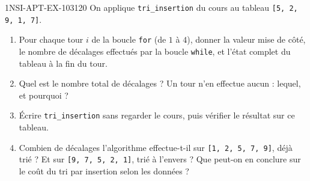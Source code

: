 \begin{exercice}{1NSI-APT-EX-103}{1}{20}
On applique \lstinline{tri_insertion} du cours au tableau \lstinline{[5, 2, 9, 1, 7]}.
\begin{enumerate}
  \item Pour chaque tour $i$ de la boucle \lstinline{for} (de $1$ à $4$), donner la valeur
    mise de côté, le nombre de décalages effectués par la boucle \lstinline{while}, et
    l'état complet du tableau à la fin du tour.
  \item Quel est le nombre total de décalages ? Un tour n'en effectue aucun : lequel, et
    pourquoi ?
  \item Écrire \lstinline{tri_insertion} sans regarder le cours, puis vérifier le résultat
    sur ce tableau.
  \item Combien de décalages l'algorithme effectue-t-il sur \lstinline{[1, 2, 5, 7, 9]},
    déjà trié ? Et sur \lstinline{[9, 7, 5, 2, 1]}, trié à l'envers ? Que peut-on en
    conclure sur le coût du tri par insertion selon les données ?
\end{enumerate}
\end{exercice}
